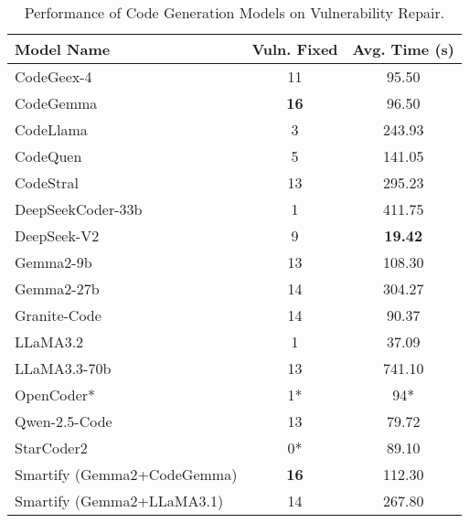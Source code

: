 \begin{table}[ht]
\centering
\caption{Performance of Code Generation Models on Vulnerability Repair.}
\label{tab:model_performance}
\begin{tabular}{|l|c|c|}
\hline
\textbf{Model Name} & \textbf{Vuln. Fixed} & \textbf{Avg. Time (s)} \\
\hline
CodeGeex-4      & 11 & 95.50 \\
\hline
CodeGemma       & \textbf{16} & 96.50 \\
\hline
CodeLlama       & 3  & 243.93 \\
\hline
CodeQuen        & 5  & 141.05 \\
\hline
CodeStral       & 13 & 295.23 \\
\hline
DeepSeekCoder-33b & 1  & 411.75 \\
\hline
DeepSeek-V2     & 9  & \textbf{19.42} \\
\hline
Gemma2-9b       & 13 & 108.30 \\
\hline
Gemma2-27b      & 14 & 304.27 \\
\hline
Granite-Code    & 14 & 90.37 \\
\hline
LLaMA3.2        & 1  & 37.09 \\
\hline
LLaMA3.3-70b    & 13 & 741.10 \\
\hline
OpenCoder*      & 1* & 94* \\
\hline
Qwen-2.5-Code   & 13 & 79.72 \\
\hline
StarCoder2      & 0* & 89.10 \\
\hline
Smartify (Gemma2+CodeGemma) & \textbf{16} & 112.30 \\
\hline
Smartify (Gemma2+LLaMA3.1)  & 14 & 267.80 \\
\hline
\end{tabular}
\end{table}



